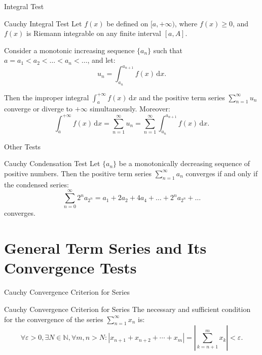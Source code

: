 \documentclass[11pt]{../../TexTemplate/elegantbook}
\begin{document}
\begin{leftbarTitle}{Integral Test}\end{leftbarTitle}
\begin{theorem}{Cauchy Integral Test}
    Let \( f(x) \) be defined on \( [a, +\infty) \), 
    where \( f(x) \geqslant 0 \), and \( f(x) \) is Riemann integrable on any finite interval \( [a, A] \).

    Consider a monotonic increasing sequence \( \{ a_n \} \) such that \( a = a_1 < a_2 < \dots < a_n < \dots \), and let:
    \[
    u_n = \int_{a_n}^{a_{n+1}} f(x) \, \mathrm{d}x.
    \]

    Then the improper integral \( \int_{a}^{+\infty} f(x) \, \mathrm{d}x \) 
    and the positive term series \( \sum_{n=1}^{\infty} u_n \) converge or diverge to \( +\infty \) simultaneously. 
    Moreover:
    \[
    \int_{a}^{+\infty} f(x) \, \mathrm{d}x 
    = \sum_{n=1}^{\infty} u_n 
    = \sum_{n=1}^{\infty} \int_{a_n}^{a_{n+1}} f(x) \, \mathrm{d}x.
    \]
\end{theorem}

\begin{leftbarTitle}{Other Tests}\end{leftbarTitle}
\begin{theorem}{Cauchy Condensation Test}
    Let \( \{ a_n \} \) be a monotonically decreasing sequence of positive numbers. 
    Then the positive term series \( \sum_{n=1}^{\infty} a_n \) converges if and only if the condensed series:
    \[
    \sum_{n=0}^{\infty} 2^n a_{2^n} = a_1 + 2a_2 + 4a_4 + \dots + 2^n a_{2^n} + \dots
    \]
    converges.
\end{theorem}


\section{General Term Series and Its Convergence Tests}
\begin{leftbarTitle}{Cauchy Convergence Criterion for Series}\end{leftbarTitle}
\begin{theorem}{Cauchy Convergence Criterion for Series}
    The necessary and sufficient condition for the convergence of the series \( \sum_{n=1}^{\infty} x_n \) is:
    \[
    \forall \varepsilon > 0, \exists N \in \mathbb{N}, \forall m, n > N : 
    \left| x_{n+1} + x_{n+2} + \cdots +x_{m} \right| = \left| \sum_{k=n+1}^{m} x_k \right| < \varepsilon.
    \]
\end{theorem}
\end{document}
